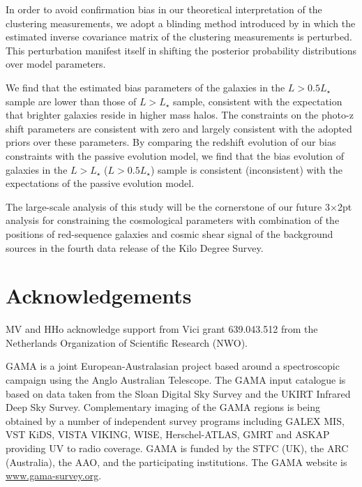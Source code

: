 \documentclass{aa}
\numberwithin{equation}{section}
\begin{document}
In order to avoid confirmation bias in our theoretical interpretation of the clustering measurements, we adopt a blinding method introduced by \citet{sellentin2019} in which the estimated inverse covariance matrix of the clustering measurements is perturbed. This perturbation manifest itself in shifting the posterior probability distributions over model parameters. 

We find that the estimated bias parameters of the galaxies in the $L>0.5L_{\star}$ sample are lower than those of $L>L_{\star}$ sample, consistent with the expectation that brighter galaxies reside in higher mass halos. The constraints on the photo-z shift parameters are consistent with zero and largely consistent with the adopted priors over these parameters. By comparing the redshift evolution of our bias constraints with the passive evolution model, we find that the bias evolution of galaxies in the $L>L_{\star}$ ($L>0.5L_{\star}$) sample is consistent (inconsistent) with the expectations of the passive evolution model. 

The large-scale analysis of this study will be the cornerstone of our future 3$\times$2pt analysis for constraining the cosmological parameters with combination of the positions of red-sequence galaxies and cosmic shear signal of the background sources in the fourth data release of the Kilo Degree Survey. 


\section*{Acknowledgements}

MV and HHo acknowledge
support from Vici grant 639.043.512 from the Netherlands
Organization of Scientific Research (NWO).

GAMA is a joint European-Australasian project based
around a spectroscopic campaign using the Anglo Australian
Telescope. The GAMA input catalogue is based on data
taken from the Sloan Digital Sky Survey and the UKIRT
Infrared Deep Sky Survey. Complementary imaging of the
GAMA regions is being obtained by a number of independent survey programs including GALEX MIS, VST
KiDS, VISTA VIKING, WISE, Herschel-ATLAS, GMRT
and ASKAP providing UV to radio coverage. GAMA is
funded by the STFC (UK), the ARC (Australia), the AAO,
and the participating institutions. The GAMA website is
\hyperlink{www.gama-survey.org}{www.gama-survey.org}.
\end{document}
